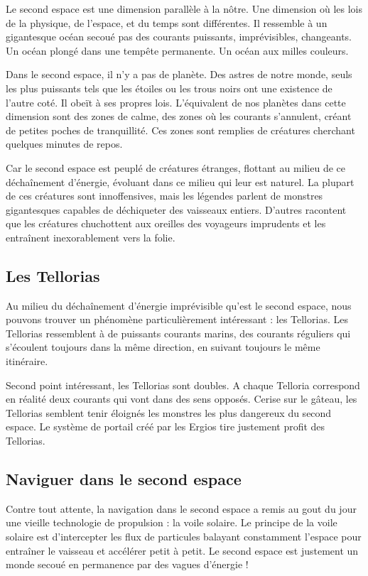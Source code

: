 \begin{multicols}{2}
Le second espace est une dimension parallèle à la nôtre. Une dimension où les lois de la physique, de l'espace, et du temps sont différentes. Il ressemble à un gigantesque océan secoué pas des courants puissants, imprévisibles, changeants. Un océan plongé dans une tempête permanente. Un océan aux milles couleurs.

Dans le second espace, il n'y a pas de planète. Des astres de notre monde, seuls les plus puissants tels que les étoiles ou les trous noirs ont une existence de l'autre coté. Il obeït à ses propres lois. L'équivalent de nos planètes dans cette dimension sont des zones de calme, des zones où les courants s'annulent, créant de petites poches de tranquillité. Ces zones sont remplies de créatures cherchant quelques minutes de repos.

Car le second espace est peuplé de créatures étranges, flottant au milieu de ce déchaînement d'énergie, évoluant dans ce milieu qui leur est naturel. La plupart de ces créatures sont innoffensives, mais les légendes parlent de monstres gigantesques capables de déchiqueter des vaisseaux entiers. D'autres racontent que les créatures chuchottent aux oreilles des voyageurs imprudents et les entraînent inexorablement vers la folie.

\subsection{Les Tellorias}

Au milieu du déchaînement d'énergie imprévisible qu'est le second espace, nous pouvons trouver un phénomène particulièrement intéressant : les Tellorias. Les Tellorias ressemblent à de puissants courants marins, des courants réguliers qui s'écoulent toujours dans la même direction, en suivant toujours le même itinéraire. 


Second point intéressant, les Tellorias sont doubles. A chaque Telloria correspond en réalité deux courants qui vont dans des sens opposés. Cerise sur le gâteau, les Tellorias semblent tenir éloignés les monstres les plus dangereux du second espace. Le système de portail créé par les Ergios tire justement profit des Tellorias.

\subsection{Naviguer dans le second espace}

Contre tout attente, la navigation dans le second espace a remis au gout du jour une vieille technologie de propulsion : la voile solaire. Le principe de la voile solaire est d'intercepter les flux de particules balayant constamment l'espace pour entraîner le vaisseau et accélérer petit à petit. Le second espace est justement un monde secoué en permanence par des vagues d'énergie !


\end{multicols}
